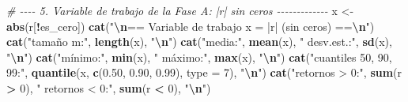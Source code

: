 \documentclass[
  spanish,
]{article}
\newenvironment{Shaded}{\begin{snugshade}}{\end{snugshade}}
\newcommand{\AttributeTok}[1]{\textcolor[rgb]{0.13,0.29,0.53}{#1}}
\newcommand{\CommentTok}[1]{\textcolor[rgb]{0.56,0.35,0.01}{\textit{#1}}}
\newcommand{\DecValTok}[1]{\textcolor[rgb]{0.00,0.00,0.81}{#1}}
\newcommand{\FloatTok}[1]{\textcolor[rgb]{0.00,0.00,0.81}{#1}}
\newcommand{\FunctionTok}[1]{\textcolor[rgb]{0.13,0.29,0.53}{\textbf{#1}}}
\newcommand{\NormalTok}[1]{#1}
\newcommand{\OtherTok}[1]{\textcolor[rgb]{0.56,0.35,0.01}{#1}}
\newcommand{\SpecialCharTok}[1]{\textcolor[rgb]{0.81,0.36,0.00}{\textbf{#1}}}
\newcommand{\StringTok}[1]{\textcolor[rgb]{0.31,0.60,0.02}{#1}}
\begin{document}
\begin{Shaded}
\begin{Highlighting}[]
\CommentTok{\# {-}{-}{-}{-} 5. Variable de trabajo de la Fase A: |r| sin ceros {-}{-}{-}{-}{-}{-}{-}{-}{-}{-}{-}{-}{-}}
\NormalTok{x }\OtherTok{\textless{}{-}} \FunctionTok{abs}\NormalTok{(r[}\SpecialCharTok{!}\NormalTok{es\_cero])}
\FunctionTok{cat}\NormalTok{(}\StringTok{"}\SpecialCharTok{\textbackslash{}n}\StringTok{== Variable de trabajo x = |r| (sin ceros) ==}\SpecialCharTok{\textbackslash{}n}\StringTok{"}\NormalTok{)}
\FunctionTok{cat}\NormalTok{(}\StringTok{"tamaño m:"}\NormalTok{, }\FunctionTok{length}\NormalTok{(x), }\StringTok{"}\SpecialCharTok{\textbackslash{}n}\StringTok{"}\NormalTok{)}
\FunctionTok{cat}\NormalTok{(}\StringTok{"media:"}\NormalTok{, }\FunctionTok{mean}\NormalTok{(x), }\StringTok{" desv.est.:"}\NormalTok{, }\FunctionTok{sd}\NormalTok{(x), }\StringTok{"}\SpecialCharTok{\textbackslash{}n}\StringTok{"}\NormalTok{)}
\FunctionTok{cat}\NormalTok{(}\StringTok{"mínimo:"}\NormalTok{, }\FunctionTok{min}\NormalTok{(x), }\StringTok{" máximo:"}\NormalTok{, }\FunctionTok{max}\NormalTok{(x), }\StringTok{"}\SpecialCharTok{\textbackslash{}n}\StringTok{"}\NormalTok{)}
\FunctionTok{cat}\NormalTok{(}\StringTok{"cuantiles 50, 90, 99:"}\NormalTok{, }\FunctionTok{quantile}\NormalTok{(x, }\FunctionTok{c}\NormalTok{(}\FloatTok{0.50}\NormalTok{, }\FloatTok{0.90}\NormalTok{, }\FloatTok{0.99}\NormalTok{), }\AttributeTok{type =} \DecValTok{7}\NormalTok{), }\StringTok{"}\SpecialCharTok{\textbackslash{}n}\StringTok{"}\NormalTok{)}
\FunctionTok{cat}\NormalTok{(}\StringTok{"retornos \textgreater{} 0:"}\NormalTok{, }\FunctionTok{sum}\NormalTok{(r }\SpecialCharTok{\textgreater{}} \DecValTok{0}\NormalTok{), }\StringTok{"  retornos \textless{} 0:"}\NormalTok{, }\FunctionTok{sum}\NormalTok{(r }\SpecialCharTok{\textless{}} \DecValTok{0}\NormalTok{), }\StringTok{"}\SpecialCharTok{\textbackslash{}n}\StringTok{"}\NormalTok{)}


\end{Highlighting}
\end{Shaded}
\end{document}
